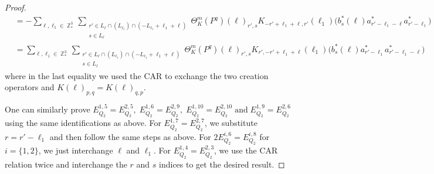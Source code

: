 \documentclass[sn-mathphys, Numbered ,a4paper]{sn-jnl}%
\DeclareMathOperator{\Z}{\mathbb{Z}}
\theoremstyle{plain}
\theoremstyle{definition}
\theoremstyle{remark}
\theoremstyle{plain}
\theoremstyle{definition}
\theoremstyle{remark}
\begin{document}
\begin{proof}
\begin{align}
		&=-\sum\limits_{\ell, \ell_1\in \Z^3_*}\sum\limits_{\substack{r' \in  L_{\ell} \cap (L_{\ell_1}) \cap (-L_{\ell_1}+\ell_1+\ell)\\ s \in L_{\ell}}} \Theta^m_K(P^q)(\ell)_{r',s} K_{-r'+\ell_1+\ell,r'}(\ell_1)\Big( b^*_{s}(\ell) a^*_{r'-\ell_1-\ell}a^*_{r'-\ell_1}\Big)\nonumber\\
		&=\sum\limits_{\ell, \ell_1\in \Z^3_*}\sum\limits_{\substack{r' \in  L_{\ell} \cap (L_{\ell_1}) \cap (-L_{\ell_1}+\ell_1+\ell)\\ s \in L_{\ell}}} \Theta^m_K(P^q)(\ell)_{r',s} K_{r',-r'+\ell_1+\ell}(\ell_1)\Big( b^*_{s}(\ell) a^*_{r'-\ell_1} a^*_{r'-\ell_1-\ell}\Big)\label{eq:EQ122} 
	\end{align}
	where in the last equality we used the CAR to exchange the two creation operators and $K(\ell)_{p,q}=K(\ell)_{q,p}$. 
	
	One can similarly prove $E_{Q_2}^{1,5}\!=\! E_{Q_2}^{2,5},\; E_{Q_2}^{1,6}\!=\! E_{Q_2}^{2,9},\; E_{Q_2}^{1,10}\!=\!E_{Q_2}^{2,10}\;\mathrm{and}\; E_{Q_2}^{1,9}\! =\! E_{Q_2}^{2,6}$ using the same identifications as above. 
	For $ E_{Q_2}^{1,7}\! =\! E_{Q_2}^{2,7}$, we substitute $r=r'-\ell_1$  and then follow the same steps as above.
	For $ 2E_{Q_2}^{i,6}\! =\! E_{Q_2}^{i,8}$ for $i=\{1,2\}$, we just interchange $\ell$ and $\ell_1$.   
	For $E_{Q_2}^{1,4}\! =\! E_{Q_2}^{2,3} $, we use the CAR relation twice and interchange the $r$ and $s$ indices to get the desired result.
\end{proof}
\end{document}
